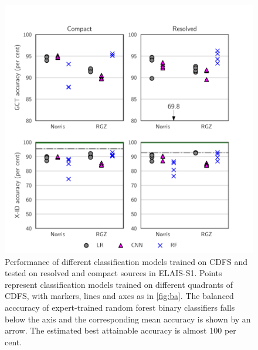 \documentclass[fleqn,usenatbib,usedcolumn]{mnras}
\begin{document}
  \begin{figure}
  \centering
  \includegraphics[]{images/elais-grid-new.pdf}
  \caption{Performance of different classification models trained on CDFS and tested on
  resolved and compact sources in ELAIS-S1. Points represent classification models
  trained on different quadrants of CDFS, with markers, lines and axes as in
  \autoref{fig:ba}. The balanced acccuracy of expert-trained random forest
  binary classifiers falls below the axis and the corresponding mean accuracy is
  shown by an arrow. The estimated best attainable accuracy is almost 100 per cent.
    \label{fig:elais-ba}}
  \end{figure}
\end{document}
